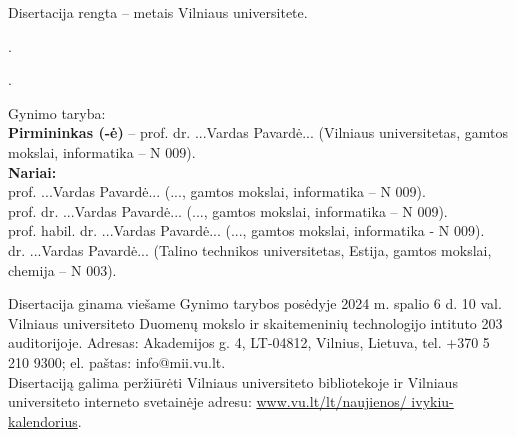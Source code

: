 \newpage
\thispagestyle{empty}                   %

\noindent\nohyphens{Disertacija rengta {\thesisPreparationStartYear} -- {\thesisYear} metais Vilniaus universitete.}


\vspace{1cm}
.

.

\vspace{1cm}
\noindent
Gynimo taryba:  \\
{\bf Pirmininkas (-ė)} {-- {prof. dr. ...Vardas Pavardė...} (Vilniaus universitetas, gamtos mokslai, informatika -- N 009).\\}
{\bf Nariai:}\\ %
{prof. ...Vardas Pavardė...}
(..., gamtos mokslai, informatika -- N 009).\\
{prof. dr. ...Vardas Pavardė...}
(..., gamtos mokslai, informatika – N 009).\\
{prof. habil. dr. ...Vardas Pavardė...}
(..., gamtos mokslai, informatika - N 009).\\
{dr. ...Vardas Pavardė...}
(Talino technikos universitetas, Estija, gamtos mokslai, chemija -- N 003).


\vspace{2cm}
\noindent
Disertacija ginama viešame Gynimo tarybos posėdyje 2024 m. spalio 6 d. 10 val. Vilniaus universiteto Duomenų mokslo ir skaitemeninių technologijo intituto  203 auditorijoje. Adresas: Akademijos g. 4, LT-04812, Vilnius, Lietuva, tel. +370 5 210 9300; el. paštas: info@mii.vu.lt.\\

\vspace{1cm}
\noindent
Disertaciją galima peržiūrėti Vilniaus universiteto bibliotekoje ir Vilniaus universiteto interneto svetainėje adresu: \href{ www.vu.lt/lt/naujienos/ivykiu-kalendorius}{ www.vu.lt/lt/naujienos/ ivykiu-kalendorius}. 

